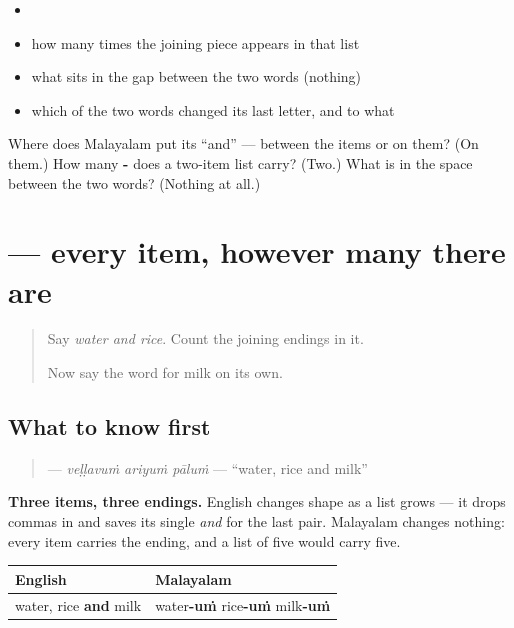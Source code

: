 \begin{itemize}
\raggedright
  \item {} 
  \item how many times the joining piece appears in that list
  \item what sits in the gap between the two words (nothing)
  \item which of the two words changed its last letter, and to what
\end{itemize}

\begin{tcolorbox}[breakable,colback=teal!4,colframe=teal!35!black,title={Before you move on}]
Where does Malayalam put its \textquotedblleft{}and\textquotedblright{} — between the items or on them? (On them.) How many \textbf{-} does a two-item list carry? (Two.) What is in the space between the two words? (Nothing at all.)
\end{tcolorbox}
\section[\texorpdfstring{\ml{വെള്ളവും} \ml{അരിയും} \ml{പാലും} (veḷḷavuṁ ariyuṁ …)}{വെള്ളവും അരിയും പാലും (veḷḷavuṁ ariyuṁ …)}]{   — every item, however many there are}

\label{lesson:ML-C70-um-more}



\begin{quote}
Say \emph{water and rice}. Count the joining endings in it.

Now say the word for milk on its own.
\end{quote}

\subsection*{What to know first}
\begin{quote}
\textbf{  } — \emph{veḷḷavuṁ ariyuṁ pāluṁ} — \textquotedblleft{}water, rice and milk\textquotedblright{}
\end{quote}

\textbf{Three items, three endings.} English changes shape as a list grows — it drops commas in and saves its single \emph{and} for the last pair. Malayalam changes nothing: every item carries the ending, and a list of five would carry five.

\noindent
\begin{tabularx}{\linewidth}{@{}>{\raggedright\arraybackslash}X>{\raggedright\arraybackslash}X@{}}
\toprule
\textbf{English} & \textbf{Malayalam} \\
\midrule
water, rice \textbf{and} milk & water\textbf{-uṁ} rice\textbf{-uṁ} milk\textbf{-uṁ} \\
\bottomrule
\end{tabularx}

